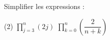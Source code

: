 %
%
	Simplifier les expressions :
	\begin{tasks} (2)
		\task $\prod_{j=3}^n (2j)$
		\task $\prod_{k=0}^n \left(\dfrac{2}{n+k}\right)$
	\end{tasks}
